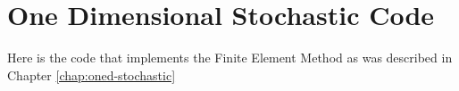 \chapter{One Dimensional Stochastic Code}\label{app:oned-stochastic-code}

Here is the code that implements the Finite Element Method as was described in
Chapter \ref{chap:oned-stochastic}


